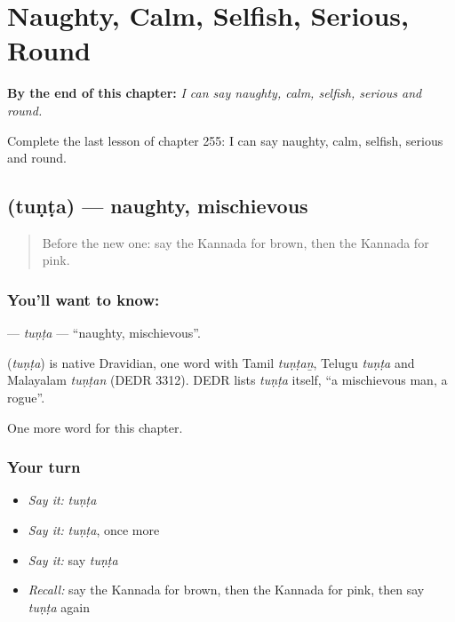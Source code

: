 
\chapter{Naughty, Calm, Selfish, Serious, Round}
\label{ch:ka-naughty-calm-selfish-serious-round}

\begin{chapteropening}
\textbf{By the end of this chapter:} \emph{I can say naughty, calm, selfish, serious and round.}

Complete the last lesson of chapter 255: I can say naughty, calm, selfish, serious and round.
\end{chapteropening}

\section[\texorpdfstring{\kn{ತುಂಟ} (tuṇṭa)}{ತುಂಟ (tuṇṭa)}]{ (tuṇṭa) — naughty, mischievous}

\label{lesson:KA-C255-tunta}



\begin{quote}
Before the new one: say the Kannada for brown, then the Kannada for pink.
\end{quote}

\subsection*{You'll want to know: }
\textbf{} — \emph{tuṇṭa} — \textquotedblleft{}naughty, mischievous\textquotedblright{}.

\begin{cousinweb}
\textbf{} (\emph{tuṇṭa}) is native Dravidian, one word with Tamil \emph{tuṇṭaṉ}, Telugu \emph{tuṇṭa} and Malayalam \emph{tuṇṭan} (DEDR 3312). DEDR lists \emph{tuṇṭa} itself, \textquotedblleft{}a mischievous man, a rogue\textquotedblright{}.
\end{cousinweb}

\begin{grammarlens}[title={What you've built}]
One more word for this chapter.
\end{grammarlens}

\subsection*{Your turn}
\begin{itemize}
\raggedright
  \item \emph{Say it:} \emph{tuṇṭa}
  \item \emph{Say it:} \emph{tuṇṭa}, once more
  \item \emph{Say it:} say \emph{tuṇṭa}
  \item \emph{Recall:} say the Kannada for brown, then the Kannada for pink, then say \emph{tuṇṭa} again
\end{itemize}

